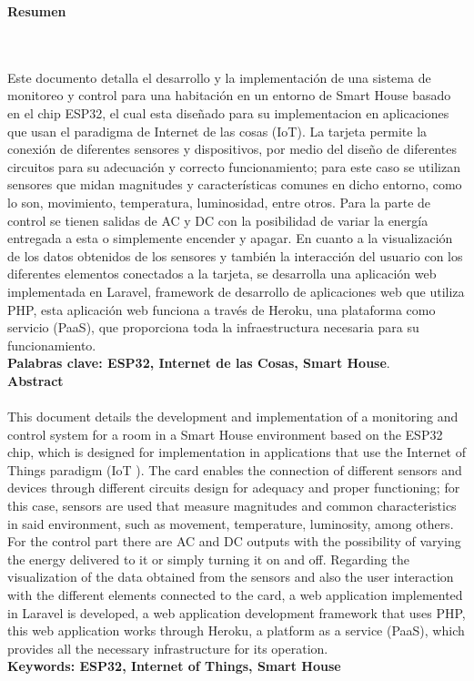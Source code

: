 \newpage
\thispagestyle{empty} \textbf{}\normalsize
\textbf{\LARGE Resumen}
\markboth{}{}
\\\\
Este documento detalla el desarrollo y la implementación de una sistema de monitoreo y control para una habitación en un entorno de Smart House basado en el chip ESP32, el cual esta diseñado para su implementacion en aplicaciones que usan el paradigma de Internet de las cosas (IoT). La tarjeta permite la conexión de diferentes sensores y dispositivos, por medio del diseño de diferentes circuitos para su adecuación y correcto funcionamiento; para este caso se utilizan sensores que midan magnitudes y características comunes en dicho entorno, como lo son, movimiento, temperatura, luminosidad, entre otros. Para la parte de control se tienen salidas de AC y DC con la posibilidad de variar la energía entregada a esta o simplemente encender y apagar. En cuanto a la visualización de los datos obtenidos de los sensores y también la interacción del usuario con los diferentes elementos conectados a la tarjeta, se desarrolla una aplicación web implementada en Laravel, framework de desarrollo de aplicaciones web que utiliza PHP, esta aplicación web funciona a través de Heroku, una plataforma como servicio (PaaS), que proporciona toda la infraestructura necesaria para su funcionamiento.\\
\textbf{\small Palabras clave: ESP32, Internet de las Cosas, Smart House}.\\[1.0cm]
\textbf{\LARGE Abstract}\\\\
This document details the development and implementation of a monitoring and control system for a room in a Smart House environment based on the ESP32 chip, which is designed for implementation in applications that use the Internet of Things paradigm (IoT ). The card enables the connection of different sensors and devices through different circuits design for adequacy and proper functioning; for this case, sensors are used that measure magnitudes and common characteristics in said environment, such as movement, temperature, luminosity, among others. For the control part there are AC and DC outputs with the possibility of varying the energy delivered to it or simply turning it on and off. Regarding the visualization of the data obtained from the sensors and also the user interaction with the different elements connected to the card, a web application implemented in Laravel is developed, a web application development framework that uses PHP, this web application works through Heroku, a platform as a service (PaaS), which provides all the necessary infrastructure for its operation.\\[1.0cm]
\textbf{\small Keywords: ESP32, Internet of Things, Smart House}